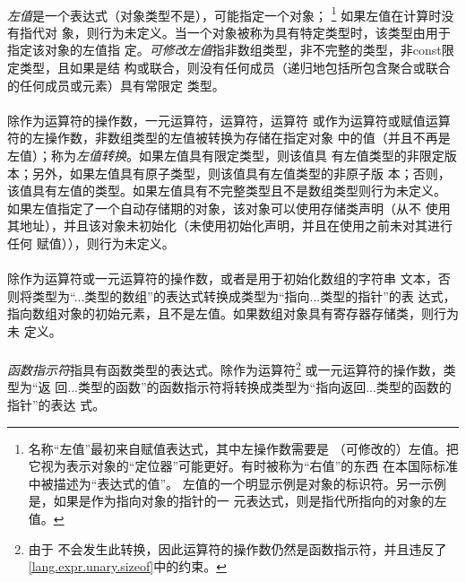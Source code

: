 {
\paragraph{}
\textit{左值}是一个表达式（对象类型不是），可能指定一个对象；
\footnote{名称``左值''最初来自赋值表达式，其中左操作数需要是
（可修改的）左值。把它视为表示对象的``定位器''可能更好。有时被称为``右值''的东西
在本国际标准中被描述为``表达式的值''。\linebreak
左值的一个明显示例是对象的标识符。另一示例是，如果是作为指向对象的指针的一
元表达式，则是指代所指向的对象的左值。} 如果左值在计算时没有指代对
象，则行为未定义。当一个对象被称为具有特定类型时，该类型由用于指定该对象的左值指
定。\textit{可修改左值}指非数组类型，非不完整的类型，非const限定类型，且如果是结
构或联合，则没有任何成员（递归地包括所包含聚合或联合的任何成员或元素）具有常限定
类型。

\paragraph{}
除作为运算符的操作数，一元\tm{\&}运算符，\tm{++}运算符，\tm{-}运算符
或作为运算符或赋值运算符的左操作数，非数组类型的左值被转换为存储在指定对象
中的值（并且不再是左值）；称为\textit{左值转换}。如果左值具有限定类型，则该值具
有左值类型的非限定版本；另外，如果左值具有原子类型，则该值具有左值类型的非原子版
本；否则，该值具有左值的类型。如果左值具有不完整类型且不是数组类型则行为未定义。
如果左值指定了一个自动存储期的对象，该对象可以使用存储类声明（从不
使用其地址），并且该对象未初始化（未使用初始化声明，并且在使用之前未对其进行任何
赋值）），则行为未定义。

\paragraph{}
除作为运算符或一元\tm{\&}运算符的操作数，或者是用于初始化数组的字符串
文本，否则将类型为``...类型的数组''的表达式转换成类型为``指向...类型的指针''的表
达式，指向数组对象的初始元素，且不是左值。如果数组对象具有寄存器存储类，则行为未
定义。

\paragraph{}
\textit{函数指示符}指具有函数类型的表达式。除作为运算符\footnote{由于
不会发生此转换，因此运算符的操作数仍然是函数指示符，并且违反了
\ref{lang.expr.unary.sizeof}中的约束。} 或一元\tm{\&}运算符的操作数，类型为``返
回...类型的函数''的函数指示符将转换成类型为``指向返回...类型的函数的指针''的表达
式。

}
